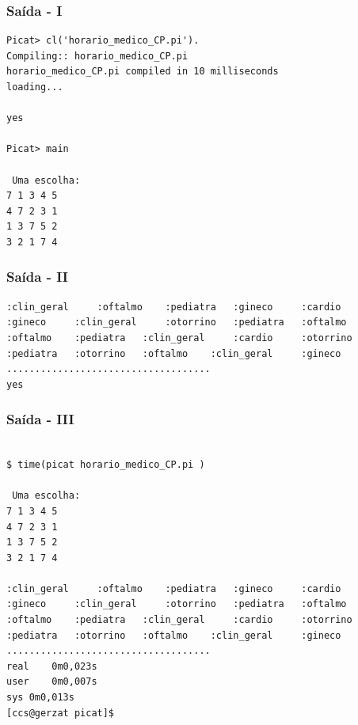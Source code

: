 \documentclass{beamer}
\begin{document}
\begin{frame}[fragile]

\frametitle{Saída - I}

\begin{footnotesize}
\begin{verbatim}
Picat> cl('horario_medico_CP.pi').
Compiling:: horario_medico_CP.pi
horario_medico_CP.pi compiled in 10 milliseconds
loading...

yes

Picat> main                       

 Uma escolha:
7 1 3 4 5 
4 7 2 3 1 
1 3 7 5 2 
3 2 1 7 4 
\end{verbatim}
  
\end{footnotesize}
\end{frame}


\begin{frame}[fragile]

\frametitle{Saída - II}

\begin{footnotesize}
\begin{verbatim}
:clin_geral 	:oftalmo 	:pediatra 	:gineco 	:cardio 	
:gineco 	:clin_geral 	:otorrino 	:pediatra 	:oftalmo 	
:oftalmo 	:pediatra 	:clin_geral 	:cardio 	:otorrino 	
:pediatra 	:otorrino 	:oftalmo 	:clin_geral 	:gineco 	
....................................
yes
\end{verbatim}
  
\end{footnotesize}
\end{frame}

\begin{frame}[fragile]

\frametitle{Saída - III}

\begin{footnotesize}
\begin{verbatim}

$ time(picat horario_medico_CP.pi )

 Uma escolha:
7 1 3 4 5 
4 7 2 3 1 
1 3 7 5 2 
3 2 1 7 4 

:clin_geral 	:oftalmo 	:pediatra 	:gineco 	:cardio 	
:gineco 	:clin_geral 	:otorrino 	:pediatra 	:oftalmo 	
:oftalmo 	:pediatra 	:clin_geral 	:cardio 	:otorrino 	
:pediatra 	:otorrino 	:oftalmo 	:clin_geral 	:gineco 	
....................................
real	0m0,023s
user	0m0,007s
sys	0m0,013s
[ccs@gerzat picat]$ 
\end{verbatim}
  
\end{footnotesize}
\end{frame}
\end{document}
